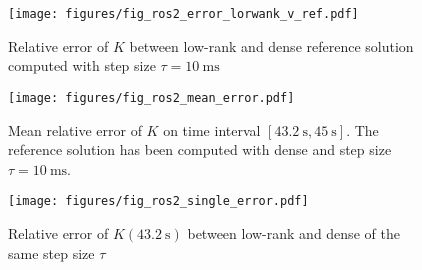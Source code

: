 \begin{figure}[t]
  \texttt{[image: figures/fig\_ros2\_error\_lorwank\_v\_ref.pdf]}
  \caption[Relative error of $K$ for LRSIF  vs dense counterpart]{%
    Relative error of $K$ between low-rank  and dense reference solution computed with step size $\tau=\SI{10}{\milli\second}$
  }
\end{figure}

\begin{figure}[t]
  \texttt{[image: figures/fig\_ros2\_mean\_error.pdf]}
  \caption[Mean relative error of $K$]{%
    Mean relative error of $K$ on time interval $[\SI{43.2}{\second}, \SI{45}{\second}]$.
    The reference solution has been computed with dense  and step size $\tau=\SI{10}{\milli\second}$.
  }
\end{figure}

\begin{figure}[t]
  \texttt{[image: figures/fig\_ros2\_single\_error.pdf]}
  \caption[Relative error of $K(\SI{43.2}{\second})$ for LRSIF and dense counterpart]{%
    Relative error of $K(\SI{43.2}{\second})$ between low-rank and dense  of the same step size $\tau$
  }
\end{figure}
